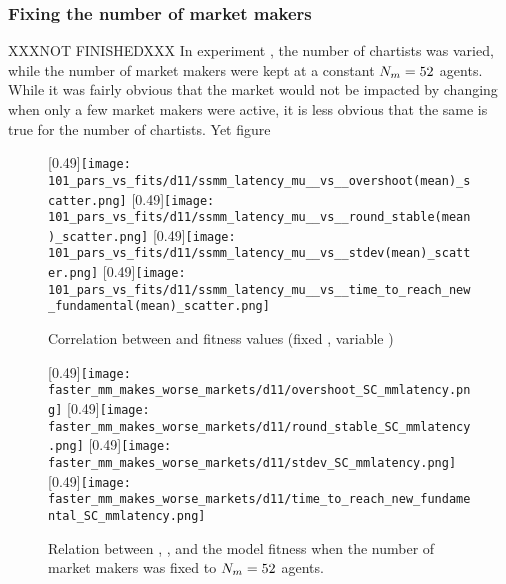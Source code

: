 \subsubsection{Fixing the number of market makers}XXXNOT FINISHEDXXX
In experiment \deleven, the number of chartists was varied, while the number of market makers were kept at a constant $N_{m} = 52$ agents. While it was fairly obvious that the market would not be impacted by changing \ssmmlatencymu when only a few market makers were active, it is less obvious that the same is true for the number of chartists. Yet figure 

\begin{figure}
	\centering
	[0.49\linewidth]{\texttt{[image: 101\_pars\_vs\_fits/d11/ssmm\_latency\_mu\_\_vs\_\_overshoot(mean)\_scatter.png]}}
	[0.49\linewidth]{\texttt{[image: 101\_pars\_vs\_fits/d11/ssmm\_latency\_mu\_\_vs\_\_round\_stable(mean)\_scatter.png]}}
	[0.49\linewidth]{\texttt{[image: 101\_pars\_vs\_fits/d11/ssmm\_latency\_mu\_\_vs\_\_stdev(mean)\_scatter.png]}}
	[0.49\linewidth]{\texttt{[image: 101\_pars\_vs\_fits/d11/ssmm\_latency\_mu\_\_vs\_\_time\_to\_reach\_new\_fundamental(mean)\_scatter.png]}}
	\caption{Correlation between \ssmmlatencymu{} and fitness values (fixed \ssmmnAgents, variable \scnAgents)}
	\label{fig:d11_parvfit_ssmmlatencymu}
\end{figure}


\begin{figure}
     \centering
     \subcaptionbox{}
     [0.49\linewidth]{\texttt{[image: faster\_mm\_makes\_worse\_markets/d11/overshoot\_SC\_mmlatency.png]}}
     \subcaptionbox{}
     [0.49\linewidth]{\texttt{[image: faster\_mm\_makes\_worse\_markets/d11/round\_stable\_SC\_mmlatency.png]}}
     \subcaptionbox{}
     [0.49\linewidth]{\texttt{[image: faster\_mm\_makes\_worse\_markets/d11/stdev\_SC\_mmlatency.png]}}
     \subcaptionbox{}
     [0.49\linewidth]{\texttt{[image: faster\_mm\_makes\_worse\_markets/d11/time\_to\_reach\_new\_fundamental\_SC\_mmlatency.png]}}
     \caption{Relation between \ssmmnAgents, \ssmmlatencymu, and the model fitness when the number of market makers was fixed to $N_{m} = 52$ agents.}
     \label{fig:faster_mm_makes_worse_markets/d11/SC_mmlatency}
\end{figure}


